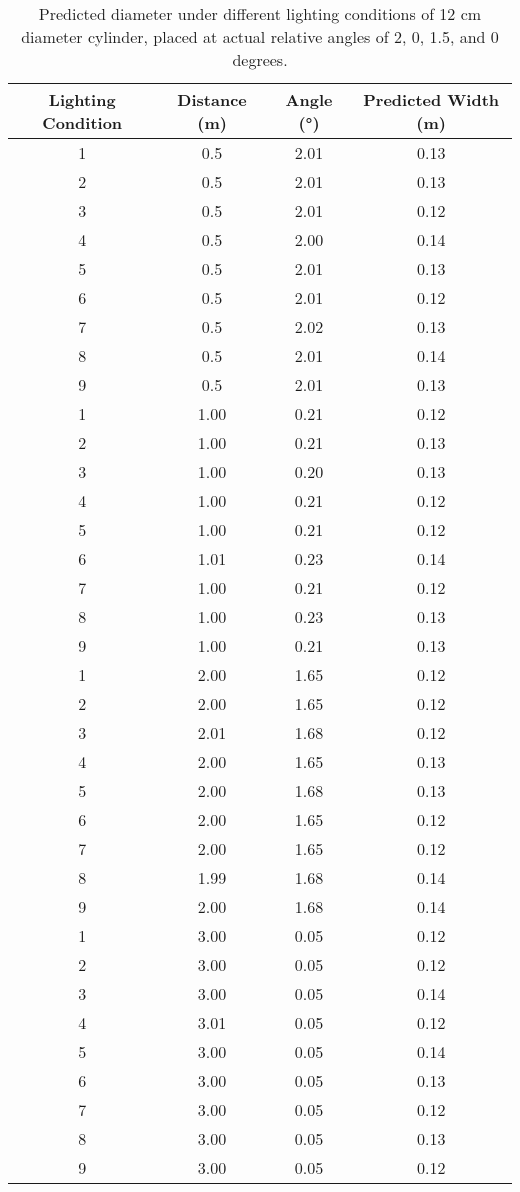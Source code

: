 \documentclass{report}
\begin{document}
\begin{table}[htbp]
\centering
\caption{Predicted diameter under different lighting conditions of 12 cm diameter cylinder, placed at actual relative angles of 2, 0, 1.5, and 0 degrees.}
\label{tab:12cm}
\begin{tabular}{cccc}
\toprule
\textbf{Lighting Condition} & \textbf{Distance (m)} & \textbf{Angle (°)} & \textbf{Predicted Width (m)} \\
\midrule
1 & 0.5 & 2.01 & 0.13 \\
2 & 0.5 & 2.01 & 0.13 \\
3 & 0.5 & 2.01 & 0.12 \\
4 & 0.5 & 2.00 & 0.14 \\
5 & 0.5 & 2.01 & 0.13 \\
6 & 0.5 & 2.01 & 0.12 \\
7 & 0.5 & 2.02 & 0.13 \\
8 & 0.5 & 2.01 & 0.14 \\
9 & 0.5 & 2.01 & 0.13 \\
\cmidrule(lr){1-4}
1 & 1.00 & 0.21 & 0.12 \\
2 & 1.00 & 0.21 & 0.13 \\
3 & 1.00 & 0.20 & 0.13 \\
4 & 1.00 & 0.21 & 0.12 \\
5 & 1.00 & 0.21 & 0.12 \\
6 & 1.01 & 0.23 & 0.14 \\
7 & 1.00 & 0.21 & 0.12 \\
8 & 1.00 & 0.23 & 0.13 \\
9 & 1.00 & 0.21 & 0.13 \\
\cmidrule(lr){1-4}
1 & 2.00 & 1.65 & 0.12 \\
2 & 2.00 & 1.65 & 0.12 \\
3 & 2.01 & 1.68 & 0.12 \\
4 & 2.00 & 1.65 & 0.13 \\
5 & 2.00 & 1.68 & 0.13 \\
6 & 2.00 & 1.65 & 0.12 \\
7 & 2.00 & 1.65 & 0.12 \\
8 & 1.99 & 1.68 & 0.14 \\
9 & 2.00 & 1.68 & 0.14 \\
\cmidrule(lr){1-4}
1 & 3.00 & 0.05 & 0.12 \\
2 & 3.00 & 0.05 & 0.12 \\
3 & 3.00 & 0.05 & 0.14 \\
4 & 3.01 & 0.05 & 0.12 \\
5 & 3.00 & 0.05 & 0.14 \\
6 & 3.00 & 0.05 & 0.13 \\
7 & 3.00 & 0.05 & 0.12 \\
8 & 3.00 & 0.05 & 0.13 \\
9 & 3.00 & 0.05 & 0.12 \\
\bottomrule
\end{tabular}
\end{table}
\end{document}
